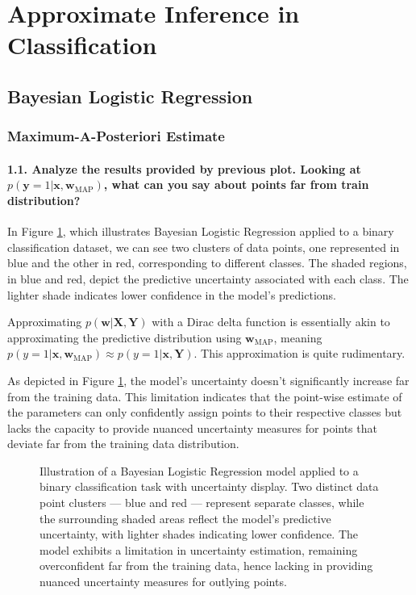 \graphicspath{{figs/3b}}

\section{Approximate Inference in Classification}
\subsection{Bayesian Logistic Regression}
\subsubsection{Maximum-A-Posteriori Estimate}
\paragraph{1.1. Analyze the results provided by previous plot. Looking at $p(\mathbf{y}=1 | \pmb{x}, \pmb{w}_{\textrm{MAP}})$, what can you say about points far from train distribution?}
In Figure \ref{fig:bayes_MAP}, which illustrates Bayesian Logistic Regression applied to a binary classification dataset, we can see two clusters of data points, one represented in blue and the other in red, corresponding to different classes. The shaded regions, in blue and red, depict the predictive uncertainty associated with each class. The lighter shade indicates lower confidence in the model's predictions.

Approximating $p(\mathbf{w} | \mathbf{X}, \mathbf{Y})$ with a Dirac delta function is essentially akin to approximating the predictive distribution using $\mathbf{w}_{\textrm{MAP}}$, meaning $p(y=1 | \mathbf{x}, \mathbf{w}_{\textrm{MAP}}) \approx p(y=1 | \mathbf{x}, \mathbf{Y})$. This approximation is quite rudimentary.

As depicted in Figure \ref{fig:bayes_MAP}, the model's uncertainty doesn't significantly increase far from the training data. This limitation indicates that the point-wise estimate of the parameters can only confidently assign points to their respective classes but lacks the capacity to provide nuanced uncertainty measures for points that deviate far from the training data distribution.

\begin{figure}[H]
    \centering
    \caption{Illustration of a Bayesian Logistic Regression model applied to a binary classification task with uncertainty display. Two distinct data point clusters — blue and red — represent separate classes, while the surrounding shaded areas reflect the model's predictive uncertainty, with lighter shades indicating lower confidence. The model exhibits a limitation in uncertainty estimation, remaining overconfident far from the training data, hence lacking in providing nuanced uncertainty measures for outlying points.}
    \label{fig:bayes_MAP}
\end{figure}

